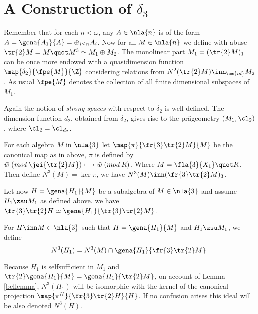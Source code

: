 \section{A Construction of $\delta_{3}$}
Remember that for each $n<\omega$, any $A\in\nla{n}$ is of the form
$A=\gena{A_{1}}{A}=\oplus_{i\leq n}A_{i}$.
Now for all $M\in\nla{n}$ we define with abuse $\tr{2}M=M\quot M^{3}\simeq{M}_{1}\oplus{M}_{2}$.
The monolinear part $M_{1}=({\tr{2}M})_{1}$ can be once more endowed with a quasidimension function
$\map{\delta_{2}}{\fpe{M}}{\Z}$
considering relations from $N^{2}(\tr{2}M)\inn_{\sm{id}}{M}_{2}$. As usual
$\fpe{M}$ denotes the collection of all finite dimensional subspaces of $M_{1}$.

Again the notion of \emph{strong spaces} with respect to $\delta _{2}$ is well defined.
The dimension function $d_{2}$, obtained from $\delta_{2}$, gives rise to the pr\"{a}geometry
$(M_{1},\cl_{2})$, where $\cl_{2}=\cl_{d_{2}}$.


\medskip

For each algebra $M$ in $\nla{3}$ let $\map{\pi}{\fr{3}\tr{2}M}{M}$ be the canonical map as in  above,
$\pi$ is defined by
$\bar w\;(\mathit{mod}\:\jei{\tr{2}M})\longmapsto\bar w \;({mod}\:R)$. Where $M=\fla{3}{X_{1}}\quot R$.
Then define $N^{3}(M)=\ker\pi$, we have $N^{3}(M)\inn(\fr{3}\tr{2}M)_{3}$.

Let now $H=\gena{H_{1}}{M}$ be a subalgebra of $M\in\nla{3}$ and assume
$H_{1}\zsu M_{1}$ as defined above.
we have $\fr{3}\tr{2}H\simeq\gena{H_{1}}{\fr{3}\tr{2}M}$.

For $H\inn M\in\nla{3}$ such that $H=\gena{H_{1}}{M}$ and
$H_{1}\zsu M_{1}$, we define
$$N^{3}(H_{1})=N^{3}(M)\cap\gena{H_{1}}{\fr{3}\tr{2}M}.$$%

Because $H_{1}$ is selfsufficient in $M_{1}$ and $\tr{2}\gena{H_{1}}{M}=\gena{H_{1}}{\tr{2}M}$,
on account of Lemma \ref{bellemma},
$N^{3}(H_{1})$ will be isomorphic with the kernel of the
canonical projection $\map{\pi^{H}}{\fr{3}\tr{2}H}{H}$. If no confusion arises
this ideal will be also denoted $N^{3}(H)$.

